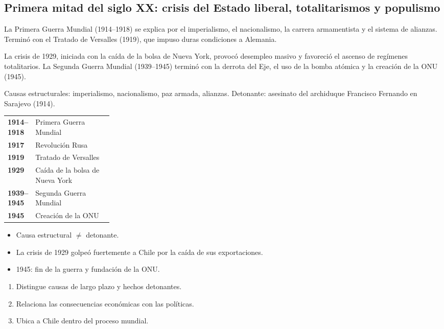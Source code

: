 \documentclass[10pt,a4paper,twocolumn]{article}
\makeatletter
\renewcommand{\arraystretch}{1.18}
\newenvironment{lineatiempo}[1][Línea de tiempo]
  {\begin{tcolorbox}[paes, acento=zinc700, title={#1}]\small\renewcommand{\arraystretch}{1.25}%
   \begin{tabular}{@{}>{\leavevmode\sffamily\bfseries\color{zinc700}}p{0.24\linewidth}p{\dimexpr0.76\linewidth-2\tabcolsep\relax}@{}}}
  {\end{tabular}\end{tcolorbox}}
\makeatother
\begin{document}
\subsection{Primera mitad del siglo XX: crisis del Estado liberal, totalitarismos y populismo}

La Primera Guerra Mundial (1914–1918) se explica por el imperialismo, el nacionalismo, la carrera armamentista y el sistema de alianzas. Terminó con el Tratado de Versalles (1919), que impuso duras condiciones a Alemania.

La crisis de 1929, iniciada con la caída de la bolsa de Nueva York, provocó desempleo masivo y favoreció el ascenso de regímenes totalitarios. La Segunda Guerra Mundial (1939–1945) terminó con la derrota del Eje, el uso de la bomba atómica y la creación de la ONU (1945).

\begin{mecanismo}
Causas estructurales: imperialismo, nacionalismo, paz armada, alianzas. Detonante: asesinato del archiduque Francisco Fernando en Sarajevo (1914).
\end{mecanismo}

\begin{lineatiempo}
1914–1918 & Primera Guerra Mundial \\
1917 & Revolución Rusa \\
1919 & Tratado de Versalles \\
1929 & Caída de la bolsa de Nueva York \\
1939–1945 & Segunda Guerra Mundial \\
1945 & Creación de la ONU \\
\end{lineatiempo}

\begin{ideasclave}
\begin{itemize}
  \item Causa estructural $\neq$ detonante.
  \item La crisis de 1929 golpeó fuertemente a Chile por la caída de sus exportaciones.
  \item 1945: fin de la guerra y fundación de la ONU.
\end{itemize}
\end{ideasclave}

\begin{metodo}
\begin{enumerate}
  \item Distingue causas de largo plazo y hechos detonantes.
  \item Relaciona las consecuencias económicas con las políticas.
  \item Ubica a Chile dentro del proceso mundial.
\end{enumerate}
\end{metodo}
\end{document}
